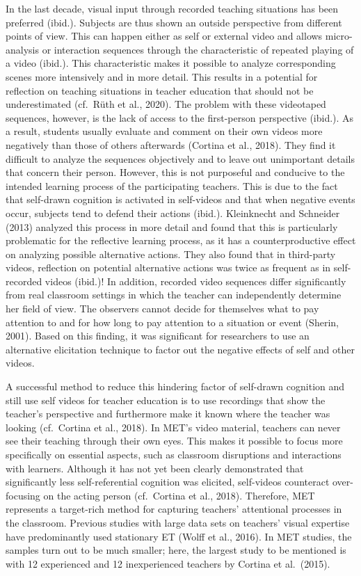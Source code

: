 \documentclass[
  man]{apa6}
\begin{document}
In the last decade, visual input through recorded teaching situations has been preferred (ibid.). Subjects are thus shown an outside perspective from different points of view. This can happen either as self or external video and allows micro-analysis or interaction sequences through the characteristic of repeated playing of a video (ibid.). This characteristic makes it possible to analyze corresponding scenes more intensively and in more detail. This results in a potential for reflection on teaching situations in teacher education that should not be underestimated (cf.~Rüth et al., 2020). The problem with these videotaped sequences, however, is the lack of access to the first-person perspective (ibid.). As a result, students usually evaluate and comment on their own videos more negatively than those of others afterwards (Cortina et al., 2018). They find it difficult to analyze the sequences objectively and to leave out unimportant details that concern their person. However, this is not purposeful and conducive to the intended learning process of the participating teachers. This is due to the fact that self-drawn cognition is activated in self-videos and that when negative events occur, subjects tend to defend their actions (ibid.). Kleinknecht and Schneider (2013) analyzed this process in more detail and found that this is particularly problematic for the reflective learning process, as it has a counterproductive effect on analyzing possible alternative actions. They also found that in third-party videos, reflection on potential alternative actions was twice as frequent as in self-recorded videos (ibid.)! In addition, recorded video sequences differ significantly from real classroom settings in which the teacher can independently determine her field of view. The observers cannot decide for themselves what to pay attention to and for how long to pay attention to a situation or event (Sherin, 2001). Based on this finding, it was significant for researchers to use an alternative elicitation technique to factor out the negative effects of self and other videos.

A successful method to reduce this hindering factor of self-drawn cognition and still use self videos for teacher education is to use recordings that show the teacher's perspective and furthermore make it known where the teacher was looking (cf.~Cortina et al., 2018). In MET's video material, teachers can never see their teaching through their own eyes. This makes it possible to focus more specifically on essential aspects, such as classroom disruptions and interactions with learners. Although it has not yet been clearly demonstrated that significantly less self-referential cognition was elicited, self-videos counteract over-focusing on the acting person (cf.~Cortina et al., 2018). Therefore, MET represents a target-rich method for capturing teachers' attentional processes in the classroom. Previous studies with large data sets on teachers' visual expertise have predominantly used stationary ET (Wolff et al., 2016). In MET studies, the samples turn out to be much smaller; here, the largest study to be mentioned is with 12 experienced and 12 inexperienced teachers by Cortina et al.~(2015).
\end{document}
